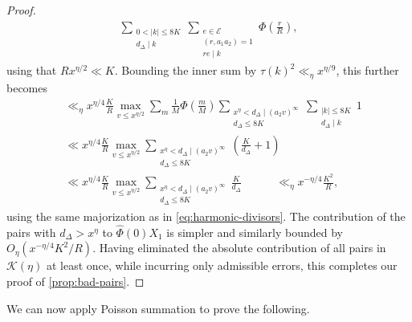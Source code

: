 \documentclass[reqno,11pt]{amsart}
\theoremstyle{definition}
\theoremstyle{remark}
\numberwithin{equation}{section}
\newcommand{\msE}{\mathscr{E}}
\newcommand{\mK}{\mathcal{K}}
\renewcommand{\hat}{\widehat}
\begin{document}
\begin{proof}
\[\begin{aligned}
    \sum_{\substack{0 < |k| \le 8K \\ d_\Delta \mid k}} \sum_{\substack{e \in \msE \\ (r,a_1a_2)=1 \\ re \mid k}} \Phi\left(\frac{r}{R}\right),
\end{aligned}
\]
using that $Rx^{\eta/2} \ll K$. Bounding the inner sum by $\tau(k)^2 \ll_\eta x^{\eta/9}$, this further becomes
\[
\begin{aligned}
    &\ll_\eta 
    x^{\eta/4} \frac{K}{R}
    \max_{v \le x^{\eta/2}}
    \sum_{m} \frac{1}{M} \Phi\left(\frac{m}{M}\right)
    \sum_{\substack{x^\eta < d_\Delta \mid (a_2v)^\infty \\ d_\Delta \le 8K}} 
    \sum_{\substack{|k| \le 8K \\ d_\Delta \mid k}} 1
    \\
    &\ll 
    x^{\eta/4} \frac{K}{R}
    \max_{v \le x^{\eta/2}}
    \sum_{\substack{x^\eta < d_\Delta \mid (a_2v)^\infty \\ d_\Delta \le 8K}} 
    \left(\frac{K}{d_\Delta} + 1 \right)
    \\
    &\ll 
    x^{\eta/4} \frac{K}{R} \max_{v \le x^{\eta/2}} \sum_{\substack{x^\eta < d_\Delta \mid (a_2 v)^\infty \\ d_\Delta \le 8K}} \frac{K}{d_\Delta}
    \qquad\quad 
    \ll_\eta 
    x^{-\eta/4} \frac{K^2}{R},
\end{aligned}
\]
using the same majorization as in \cref{eq:harmonic-divisors}. The contribution of the pairs with $d_\Delta > x^\eta$ to $\hat{\Phi}(0) X_1$ is simpler and similarly bounded by $O_\eta(x^{-\eta/4} K^2/R)$. Having eliminated the absolute contribution of all pairs in $\mK(\eta)$ at least once, while incurring only admissible errors, this completes our proof of \cref{prop:bad-pairs}.
\end{proof}

We can now apply Poisson summation to prove the following.
\end{document}
